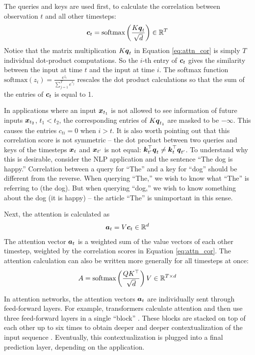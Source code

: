 The queries and keys are used first, to calculate the correlation between observation $t$ and all other timesteps:
\begin{equation}
  \boldsymbol{c}_t = \text{softmax}\left(\frac{K \boldsymbol{q}_t}{\sqrt{d}} \right) \in \mathbb{R}^T
  \label{eq:attn_cor}
\end{equation}
Notice that the matrix multiplication $K \boldsymbol{q}_t$ in Equation \ref{eq:attn_cor} is simply $T$ individual dot-product computations. So the $i$-th entry of $\boldsymbol{c}_t$ gives the similarity between the input at time $t$ and the input at time $i$. The softmax function $\text{softmax}(z_i) = \displaystyle\frac{e^{z_i}}{\sum_{j=1}^T e^{z_j}}$ rescales the dot product calculations so that the sum of the entries of $\boldsymbol{c}_t$ is equal to 1. 

In applications where an input $\boldsymbol{x}_{t_1}$ is not allowed to see information of future inputs $\boldsymbol{x}_{t_2}$, $t_1<t_2$, the corresponding entries of $K\boldsymbol{q}_{t_1}$ are masked to be $-\infty$. This causes the entries $c_{ti} = 0$ when $i > t$. It is also worth pointing out that this correlation score is not symmetric -- the dot product between two queries and keys of the timesteps $\boldsymbol{x}_t$ and $\boldsymbol{x}_{t'}$ is not equal: $\boldsymbol{k}_{t'}^\top \boldsymbol{q}_t \not = \boldsymbol{k}_t^\top \boldsymbol{q}_{t'}$. To understand why this is desirable, consider the NLP application and the sentence ``The dog is happy.'' Correlation between a query for ``The'' and a key for ``dog'' should be different from the reverse. When querying ``The,'' we wish to know what ``The'' is referring to (the dog). But when querying ``dog,'' we wish to know something about the dog (it is happy) -- the article ``The'' is unimportant in this sense.

Next, the attention is calculated as 
\begin{equation}
  \boldsymbol{a}_t = V \boldsymbol{c}_t \in \mathbb{R}^d
  \label{eq:attn}
\end{equation}
The attention vector $\boldsymbol{a}_t$ is a weighted sum of the value vectors of each other timestep, weighted by the correlation scores in Equation \ref{eq:attn_cor}. The attention calculation can also be written more generally for all timesteps at once:
\begin{equation}
  A = \text{softmax}\left(\frac{QK^\top}{\sqrt{d}} \right) V \in \mathbb{R}^{T \times d}
  \label{eq:attn_matrix}
\end{equation}

In attention networks, the attention vectors $\boldsymbol{a}_t$ are individually sent through feed-forward layers. For example, transformers calculate attention and then use three feed-forward layers in a single ``block'' \cite{vaswani2017}. These blocks are stacked on top of each other up to six times to obtain deeper and deeper contextualization of the input sequence \cite{dai2019}. Eventually, this contextualization is plugged into a final prediction layer, depending on the application.

